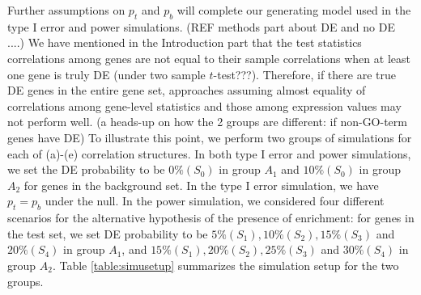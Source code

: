 \documentclass[a4,center,fleqn]{NAR}
\newcommand{\aaCase}{a}
\newcommand{\fCase}{e}
\begin{document}
	Further assumptions on $p_t$ and $p_b$ will complete our generating model used in the type I error and power simulations. (REF methods part about DE and no DE ....)
	We have mentioned in the Introduction part that the test statistics correlations among genes are
	not equal to their sample correlations when at least one gene is truly DE (under two sample
	$t$-test???). Therefore, if there are true DE genes in the entire gene set, approaches assuming
	almost equality of correlations among gene-level statistics and those among expression values may
	not perform well. (a heads-up on how the 2 groups are different: if non-GO-term genes have DE) To illustrate this point, we perform two groups of simulations for each of 
	(\aaCase)-(\fCase) correlation structures. In both type I error and power simulations, we set the DE
	probability to be $0\%(S_0)$ in group $A_1$ and $10\%(S_0)$ in group $A_2$ for genes in the
	background set. In the type I error simulation, we have $p_t = p_b$ under the null. In the power
	simulation, we considered four different scenarios for the alternative hypothesis of the presence of enrichment: for genes in the test set, we set DE
	probability to be $5\% (S_1), 10\%(S_2), 15\%(S_3)$ and $20\%(S_4)$ in group $A_1$, and $15\%(S_1),
	20\%(S_2), 25\%(S_3)$ and $30\%(S_4)$ in group $A_2$. Table \ref{table:simusetup} summarizes the
	simulation setup for the two groups.
	
	
	
\end{document}

